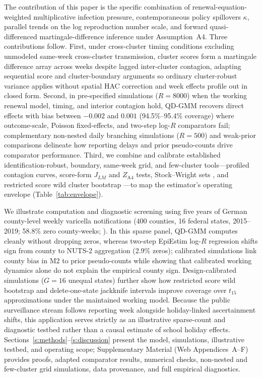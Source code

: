 The contribution of this paper is the specific combination of renewal-equation-weighted
multiplicative infection pressure, contemporaneous policy spillovers $\kappa$, parallel trends on
the log reproduction number scale, and forward quasi-differenced martingale-difference inference
under Assumption~A4. Three contributions follow. First, under cross-cluster timing conditions
excluding unmodeled same-week cross-cluster transmission, cluster scores form a martingale
difference array across weeks despite lagged inter-cluster contagion, adapting sequential score
and cluster-boundary arguments \citep{bester2011inference,bong2024frequentist} so ordinary
cluster-robust variance applies without spatial HAC correction and week effects profile out in
closed form. Second, in pre-specified simulations ($R=8000$) when the working renewal model, timing,
and interior contagion hold, QD-GMM recovers direct effects with bias between $-0.002$ and $0.001$
(94.5\%--95.4\% coverage) where outcome-scale, Poisson fixed-effects, and two-step log-$R$
comparators fail; complementary non-nested daily branching simulations ($R=500$) and weak-prior
comparisons delineate how reporting delays and prior pseudo-counts drive comparator performance.
Third, we combine and calibrate established identification-robust, boundary, same-week grid, and
few-cluster tools---profiled contagion curves, score-form $J_{LM}$ and $Z_{\mathrm{A4}}$ tests,
Stock--Wright sets \citep{stock2000weak,cox2026simple}, and restricted score wild cluster bootstrap
\citep{kline2012score,webb2023reworking}---to map the estimator's operating envelope (Table~\ref{tab:envelope}).

We illustrate computation and diagnostic screening using five years of German county-level weekly
varicella notifications (400 counties, 16 federal states, 2015--2019; 58.8\% zero county-weeks;
\citealp{faensen2006survnet,vink2014serial,cauchemez2008school,jackson2014varicella}). In this
sparse panel, QD-GMM computes cleanly without dropping zeros, whereas two-step EpiEstim log-$R$
regression shifts sign from county to NUTS-2 aggregation (2.9\% zeros); calibrated simulations link
county bias in M2 to prior pseudo-counts while showing that calibrated working dynamics alone do not
explain the empirical county sign. Design-calibrated simulations ($G=16$ unequal states) further
show how restricted score wild bootstrap and delete-one-state jackknife intervals improve coverage
over $t_{15}$ approximations under the maintained working model. Because the public surveillance stream follows
reporting week alongside holiday-linked ascertainment shifts, this application serves strictly as an
illustrative sparse-count and diagnostic testbed rather than a causal estimate of school holiday
effects. Sections~\ref{s:methods}--\ref{s:discussion} present the model, simulations, illustrative
testbed, and operating scope; Supplementary Material (Web Appendices~A--F) provides proofs,
adapted comparator results, numerical checks, non-nested and few-cluster grid simulations, data
provenance, and full empirical diagnostics.
